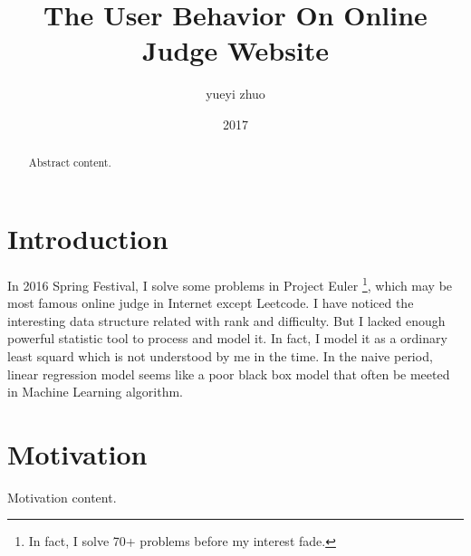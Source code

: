 \documentclass{article}
\title{The User Behavior On Online Judge Website}
\author{yueyi zhuo}
\date{2017}
\begin{document}
\maketitle

\begin{abstract}

Abstract content.

\end{abstract}

\section{Introduction}

In 2016 Spring Festival, I solve some problems in Project Euler 
\footnote{In fact, I solve 70+ problems before my interest fade.}, 
which may be most famous online judge 
in Internet except Leetcode. I have noticed the interesting data structure related with rank and difficulty.
But I lacked enough powerful statistic tool to process and model it. 
In fact, I model it as a ordinary least squard which is not understood by me in the time. In the naive period,
linear regression model seems like a poor black box model that often be meeted in Machine Learning algorithm.

\section{Motivation}

Motivation content.
\end{document}
